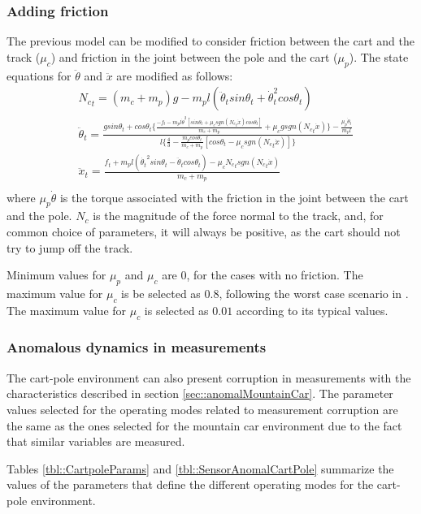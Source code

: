 \documentclass{article}
\begin{document}
\subsubsection{Adding friction}
The previous model can be modified to consider friction between the cart and the track ($\mu_c$) and friction in the joint between the pole and the cart ($\mu_p$).
The state equations for $\ddot{\theta}$ and $\ddot{x}$ are modified as follows:
\begin{equation}
\begin{aligned}
&{N_c}_t = (m_c + m_p)g - m_p l (\ddot{\theta}_t sin\theta_t + \dot{\theta}_t^2cos\theta_t)\\
&\ddot{\theta}_t = \frac{g sin\theta_t + cos\theta_t\{\frac{-f_t - m_p l \dot{\theta}^2[sin\theta_t + \mu_c sgn({N_c}_t \dot{x})cos\theta_t]}{m_c + m_p} + \mu_c g sgn({N_c}_t \dot{x})\} - \frac{\mu_p \dot{\theta}_t}{m_p l}}{l\{\frac{4}{3} - \frac{m_pcos\theta_t}{m_c + m_p}[cos\theta_t - \mu_c sgn({N_c}_t \dot{x})]\}}\\
&\ddot{x}_t = \frac{f_t + m_p l (\dot{\theta_t}^2sin\theta_t - \ddot{\theta}_t cos\theta_t) - \mu_c {N_c}_tsgn({N_c}_t \dot{x})}
{m_c + m_p}\\
\end{aligned}
\end{equation}
where $\mu_p \dot{\theta}$ is the torque associated with the friction in the joint between the cart and the pole. $N_c$ is the magnitude of the force normal to the track, and, for common choice of parameters, it will always be positive, as the cart should not try to jump off the track.

Minimum values for $\mu_p$ and $\mu_c$ are 0, for the cases with no friction. The maximum value for $\mu_c$ is be selected as $0.8$, following the worst case scenario in \cite{Manrique2020}. The maximum value for $\mu_c$ is selected as $0.01$ according to its typical values.

\subsubsection{Anomalous dynamics in measurements}
The cart-pole environment can also present corruption in measurements with the characteristics described in section \ref{sec::anomalMountainCar}. The parameter values selected for the operating modes related to measurement corruption are the same as the ones selected for the mountain car environment due to the fact that similar variables are measured.

Tables \ref{tbl::CartpoleParams} and \ref{tbl::SensorAnomalCartPole} summarize the values of the parameters that define the different operating modes for the cart-pole environment. 
\end{document}
